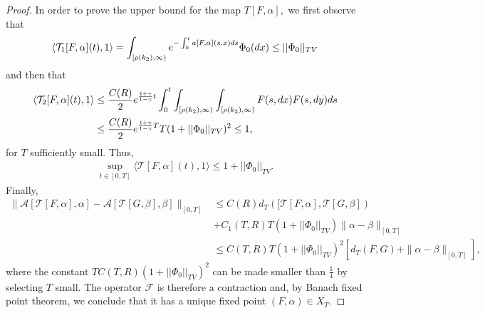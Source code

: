 \documentclass[11pt]{article}
\numberwithin{equation}{section}
\theoremstyle{plain}
\newtheorem{lemma}[theorem]{Lemma}
\newcommand{\der}{\textup{d}}
\begin{document}
\begin{proof}
In order to prove the upper bound for the map $T[F,\alpha],$ we first observe that
\begin{align*}
\langle \mathcal T_1[F,\alpha](t), 1 \rangle= \int_{[\rho(k_2), \infty)} e^{-\int_{0}^{t}a[F,\alpha](s,x)\der s} \Phi_0(\der x) \leq ||\Phi_{0}||_{TV}
\end{align*}
and then that
\begin{align*}
 \langle \mathcal T_2[F,\alpha](t), 1 \rangle &\leq \frac{C(R)}{2}e^{\frac{1+\gamma}{1-\gamma}t} \int_0^t \int_{[\rho(k_2), \infty)} \int_{[\rho(k_2), \infty)} F(s, \der x) F(s, \der y)\der s\\
 &\leq \frac{C(R)}{2}e^{\frac{1+\gamma}{1-\gamma}T}T(1+||\Phi_{0}||_{TV})^{2}\leq 1,
\end{align*}
for $T$ sufficiently small. Thus,
\begin{align*}
\sup_{t\in[0,T]}\langle \mathcal T[F,\alpha](t), 1 \rangle\leq 1+||\Phi_{0}||_{TV}.
\end{align*}
Finally, 
\begin{align*}
  \|  \mathcal A [\mathcal T[F,\alpha], \alpha ]-   \mathcal A [\mathcal T[G,\beta], \beta] \|_{[0,T]} &\leq  C(R) d_T([\mathcal T[F,\alpha],\mathcal T[G,\beta])\\
  &+ C_1(T,R)T(1+||\Phi_{0}||_{TV}) \|\alpha - \beta \|_{[0,T]} \\
  &\leq C(T,R)T(1+||\Phi_{0}||_{TV})^{2} [d_T(F,G)+\|\alpha - \beta \|_{[0,T]}],
\end{align*}
where the constant $TC(T,R)(1+||\Phi_{0}||_{TV})^{2}$ can be made smaller than $\frac{1}{4}$ by selecting $T$ small. 
The operator $\mathcal F$ is therefore a  contraction and, by Banach fixed point theorem, we conclude that it has a unique fixed point $(F, \alpha ) \in X_T$. 
\end{proof} 


\end{document}
